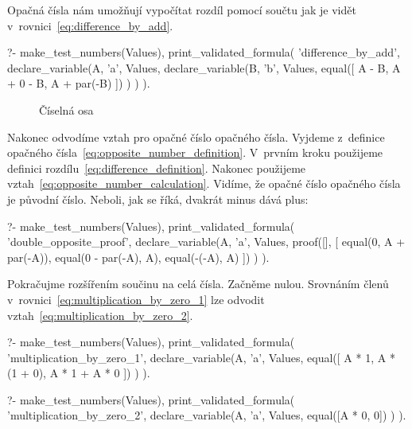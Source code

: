 Opačná čísla nám umožňují vypočítat rozdíl pomocí součtu jak je vidět v~rovnici~\eqref{eq:difference_by_add}.

\begin{prolog}
?-	make_test_numbers(Values),
	print_validated_formula(
		'difference_by_add',
		declare_variable(A, 'a', Values,
			declare_variable(B, 'b', Values,
				equal([
					A - B,
					A + 0 - B,
					A + par(-B)
				])
			)
		)
	).
\end{prolog}

\begin{figure}[!h]
\centering
{}
\caption{Číselná osa}
\label{img:integer_number_line}
\end{figure}

Nakonec odvodíme vztah pro opačné číslo opačného čísla. Vyjdeme z~definice opačného čísla~\eqref{eq:opposite_number_definition}. V~prvním kroku použijeme definici rozdílu~\eqref{eq:difference_definition}. Nakonec použijeme vztah~\eqref{eq:opposite_number_calculation}. Vidíme, že opačné číslo opačného čísla je původní číslo. Neboli, jak se říká, dvakrát minus dává plus:

\begin{prolog}
?-	make_test_numbers(Values),
	print_validated_formula(
		'double_opposite_proof',
		declare_variable(A, 'a', Values,
			proof([],
			[
				equal(0, A + par(-A)),
				equal(0 - par(-A), A),
				equal(-(-A), A)
			])
		)
	).
\end{prolog}

Pokračujme rozšířením součinu na celá čísla. Začněme nulou. Srovnáním členů v~rovnici~\eqref{eq:multiplication_by_zero_1} lze odvodit vztah~\eqref{eq:multiplication_by_zero_2}.

\begin{prolog}
?-	make_test_numbers(Values),
	print_validated_formula(
		'multiplication_by_zero_1',
		declare_variable(A, 'a', Values,
			equal([
				A * 1,
				A * (1 + 0),
				A * 1 + A * 0
			])
		)
	).
\end{prolog}
\begin{prolog}
?-	make_test_numbers(Values),
	print_validated_formula(
		'multiplication_by_zero_2',
		declare_variable(A, 'a', Values,
			equal([A * 0, 0])
		)
	).
\end{prolog}

